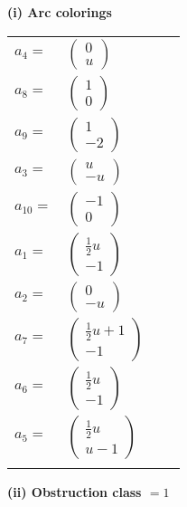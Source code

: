 \documentclass[1p]{elsarticle_modified}
\theoremstyle{definition}
\begin{document}
\flushleft \textbf{(i) Arc colorings}\\
\begin{tabular}{m{7pt} m{180pt} m{7pt} m{180pt} }
\flushright $a_{4}=$&$\begin{pmatrix}0\\u\end{pmatrix}$ \\
\flushright $a_{8}=$&$\begin{pmatrix}1\\0\end{pmatrix}$ \\
\flushright $a_{9}=$&$\begin{pmatrix}1\\-2\end{pmatrix}$ \\
\flushright $a_{3}=$&$\begin{pmatrix}u\\- u\end{pmatrix}$ \\
\flushright $a_{10}=$&$\begin{pmatrix}-1\\0\end{pmatrix}$ \\
\flushright $a_{1}=$&$\begin{pmatrix}\frac{1}{2} u\\-1\end{pmatrix}$ \\
\flushright $a_{2}=$&$\begin{pmatrix}0\\- u\end{pmatrix}$ \\
\flushright $a_{7}=$&$\begin{pmatrix}\frac{1}{2} u+1\\-1\end{pmatrix}$ \\
\flushright $a_{6}=$&$\begin{pmatrix}\frac{1}{2} u\\-1\end{pmatrix}$ \\
\flushright $a_{5}=$&$\begin{pmatrix}\frac{1}{2} u\\u-1\end{pmatrix}$\\&\end{tabular}
\flushleft \textbf{(ii) Obstruction class $= 1$}\\~\\
\end{document}
